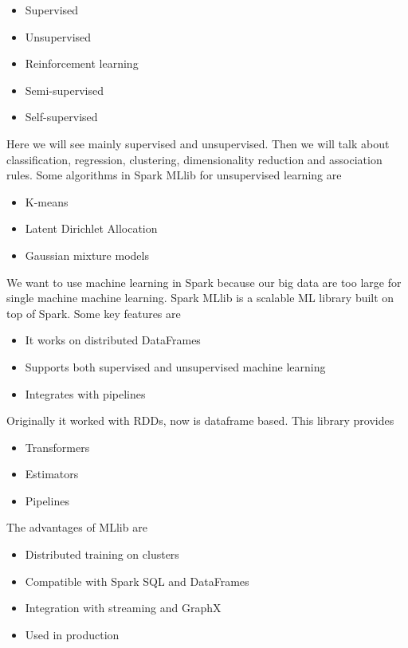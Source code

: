 \begin{itemize}
    \item Supervised
    \item Unsupervised
    \item Reinforcement learning
    \item Semi-supervised 
    \item Self-supervised
\end{itemize}

Here we will see mainly supervised and unsupervised. Then we will talk about classification, regression, clustering, dimensionality reduction and association rules. Some algorithms in Spark MLlib for unsupervised learning are

\begin{itemize}
    \item K-means
    \item Latent Dirichlet Allocation 
    \item Gaussian mixture models
\end{itemize}

We want to use machine learning in Spark because our big data are too large for single machine machine learning. Spark MLlib is a scalable ML library built on top of Spark. Some key features are 
\begin{itemize}
    \item It works on distributed DataFrames
    \item Supports both supervised and unsupervised machine learning
    \item Integrates with pipelines
\end{itemize}

Originally it worked with RDDs, now is dataframe based. This library provides
\begin{itemize}
    \item Transformers
    \item Estimators
    \item Pipelines
\end{itemize}

The advantages of MLlib are
\begin{itemize}
    \item Distributed training on clusters
    \item Compatible with Spark SQL and DataFrames
    \item Integration with streaming and GraphX
    \item Used in production
\end{itemize}

